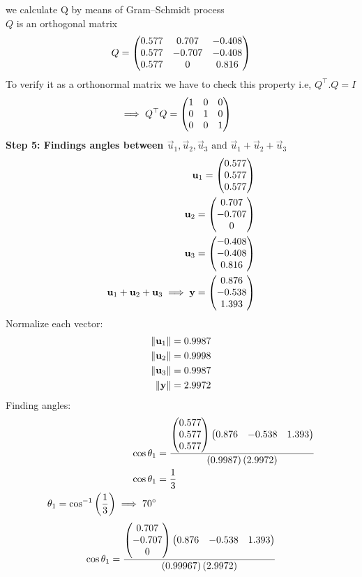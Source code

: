 \documentclass[11pt]{book}
\begin{document}
\begin{enumerate}
we calculate Q by means of Gram–Schmidt process\\
$Q$ is an orthogonal matrix 
\begin{align*}
    Q=\begin{pmatrix} 0.577&0.707&-0.408\\0.577&-0.707&-0.408\\0.577&0&0.816\end{pmatrix}
\end{align*}
To verify it as a orthonormal matrix we have to check this property i.e,  $Q^{\top}.Q =I$
\begin{align*}
    \implies Q^\top Q &= \begin{pmatrix}1&0&0\\0&1&0\\0&0&1\end{pmatrix}
\end{align*}
\textbf{Step 5: Findings angles between $\vec{u}_1,\vec{u}_2,\vec{u}_3  \text{ and } \vec{u}_1+\vec{u}_2+\vec{u}_3 $}
\begin{align}
    \mathbf{u}_1=\begin{pmatrix}0.577\\0.577\\0.577\end{pmatrix}\\
    \mathbf{u}_2=\begin{pmatrix}0.707 \\ -0.707 \\ 0\end{pmatrix} \\
    \mathbf{u}_3=\begin{pmatrix}-0.408\\-0.408\\0.816\end{pmatrix}\\
    \mathbf{u}_1+\mathbf{u}_2+\mathbf{u}_3\implies\mathbf{y}=\begin{pmatrix}0.876\\-0.538\\1.393\end{pmatrix}
\end{align}
Normalize each vector:\\
   \begin{align}
    \left\lVert\mathbf{u}_1\right\rVert=0.9987\\
    \left\lVert\mathbf{u}_2\right\rVert=0.9998\\
     \left\lVert\mathbf{u}_3\right\rVert=0.9987\\
     \left\lVert\mathbf{y}\right\rVert=2.9972
   \end{align}
Finding angles:
\begin{align}
    \cos{\theta_1}&=\frac{\begin{pmatrix}0.577 \\0.577 \\0.577\end{pmatrix}\begin{pmatrix}0.876&-0.538&1.393\end{pmatrix}}{\left(0.9987\right)\left(2.9972\right)}\\
    \cos{\theta_1}&=\frac{1}{3}\\
    \theta_1=\cos^{-1}\left(\frac{1}{3}\right)
    \implies 70\degree
\end{align}
\begin{align}
   \cos{\theta_1}&=\frac{\myvec{0.707 \\-0.707 \\0}\myvec{0.876&-0.538&1.393}}{\brak{0.99967}\brak{2.9972}}\\

\end{align}
\end{enumerate}
\end{document}
